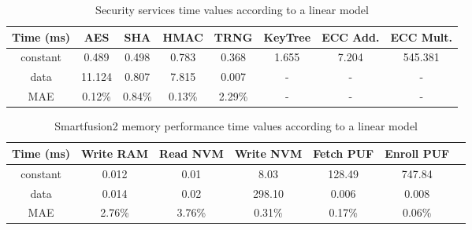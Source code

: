 \begin{table}[h!]
\centering
\def\arraystretch{1.5}
\begin{tabular}{|c|c|c|c|c|c|c|c|}
\hline
	Time (ms) & AES    & SHA    & HMAC   & TRNG   & KeyTree & ECC Add. & ECC Mult.   \\ \hline
	constant  & 0.489  & 0.498 & 0.783  & 0.368  & 1.655   & 7.204 & 545.381 \\ \hline
	data      & 11.124 & 0.807  & 7.815  & 0.007  & -       & -  & - \\ \hline
	MAE       & 0.12\% & 0.84\% & 0.13\% & 2.29\% & -       & -  & - \\ \hline
\end{tabular}
\caption{Security services time values according to a linear model}
\label{tab:core-model}
\end{table}

\begin{table}[h!]
\centering
\def\arraystretch{1.5}
\begin{tabular}{|c|c|c|c|c|c|c|}
\hline
	Time (ms) & Write RAM & Read NVM & Write NVM & Fetch PUF & Enroll PUF \\ \hline
	constant  & 0.012     & 0.01     & 8.03      & 128.49    & 747.84  \\ \hline
	data      & 0.014     & 0.02     & 298.10    & 0.006     & 0.008  \\ \hline
	MAE       & 2.76\%    & 3.76\%   & 0.31\%    & 0.17\%    & 0.06\%  \\ \hline
\end{tabular}
\caption{Smartfusion2 memory performance time values according to a linear model}
\label{tab:core-model}
\end{table}
